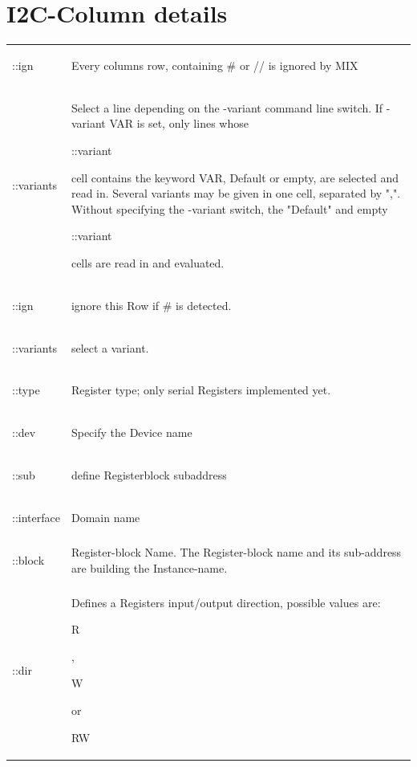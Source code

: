 \documentclass[a4paper,12pt]{report}
\begin{document}
\section{I2C-Column details}
\begin{tabular}{lp{14cm}}
  \begin{bf}::ign\end{bf} & Every columns row, containing \# or // is ignored by MIX\\
  \begin{bf}::variants\end{bf} & Select a line depending on the -variant command line switch. If -variant VAR is set, only lines whose \begin{tt}::variant\end{tt} cell contains the keyword VAR, Default or empty, are selected and  read in. Several variants may be given in one cell, separated by ",". Without specifying the -variant switch, the "Default" and empty \begin{tt}::variant\end{tt} cells are read in and evaluated.\\
  \begin{bf}::ign\end{bf} & ignore this Row if # is detected.\\
  \begin{bf}::variants\end{bf} & select a variant.\\
  \begin{bf}::type\end{bf} & Register type; only serial Registers implemented yet.\\
  \begin{bf}::dev\end{bf} & Specify the Device name\\
  \begin{bf}::sub\end{bf} & define Registerblock subaddress\\
  \begin{bf}::interface\end{bf} & Domain name\\
  \begin{bf}::block\end{bf} & Register-block Name. The Register-block name and its sub-address are building the Instance-name.\\
  \begin{bf}::dir\end{bf} & Defines a Registers input/output direction, possible values are: \begin{tt}R\end{tt}, \begin{tt}W\end{tt} or \begin{tt}RW\end{tt}\\

\end{tabular}
\end{document}
